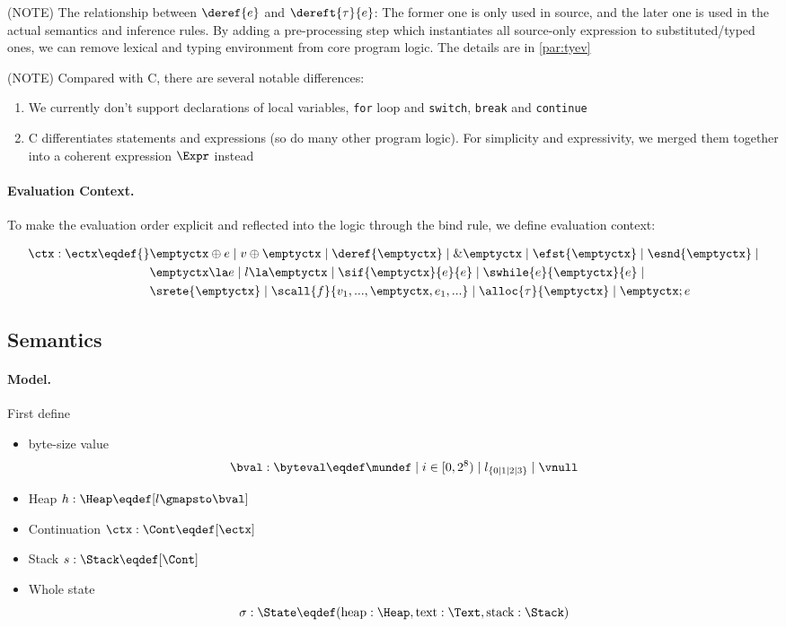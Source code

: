 (NOTE) The relationship between $\deref{e}$ and $\dereft{\tau}{e}$: The former one is only used in source,
and the later one is used in the actual semantics and inference rules.
By adding a pre-processing step which instantiates all source-only expression to substituted/typed ones,
we can remove lexical and typing environment from core program logic. The details are in \ref{par:tyev}

(NOTE) Compared with C, there are several notable differences:
\begin{enumerate}
  \item We currently don't support declarations of local variables, \texttt{for} loop and \texttt{switch},
    \texttt{break} and \texttt{continue}
  \item C differentiates statements and expressions (so do many other program logic). For simplicity and
    expressivity, we merged them together into a coherent expression $\Expr$ instead
\end{enumerate}

\paragraph{Evaluation Context.}

To make the evaluation order explicit and reflected into the logic through the bind rule,
we define evaluation context:

\begin{align*}
    \ctx : \ectx \eqdef{}&
        \emptyctx \oplus e \mid v \oplus \emptyctx \mid
        \deref{\emptyctx} \mid \& \emptyctx \mid
        \efst{\emptyctx} \mid \esnd{\emptyctx} \mid \\&
        \emptyctx \la e \mid l \la \emptyctx \mid \sif{\emptyctx}{e}{e} \mid \swhile{e}{\emptyctx}{e} \mid \\&
        \srete{\emptyctx} \mid \scall{f}{v_1, ..., \emptyctx, e_1, ...} \mid \alloc{\tau}{\emptyctx} \mid \emptyctx ; e
\end{align*}

\subsection{Semantics}\label{sec:semantics}
\paragraph{Model.}

First define
\begin{itemize}
\item byte-size value \[\bval : \byteval \eqdef \mundef \mid i \in [0, 2^8) \mid l_{\{0 \mid 1 \mid 2 \mid 3\}} \mid \vnull\]
\item Heap $h: \Heap \eqdef [ l \gmapsto \bval ]$
\item Continuation $\ctx: \Cont \eqdef [\ectx]$
\item Stack $s: \Stack \eqdef [\Cont]$
\item Whole state \[\sigma: \State \eqdef (\text{heap}: \Heap, \text{text}: \Text, \text{stack}: \Stack)\]
\end{itemize}

